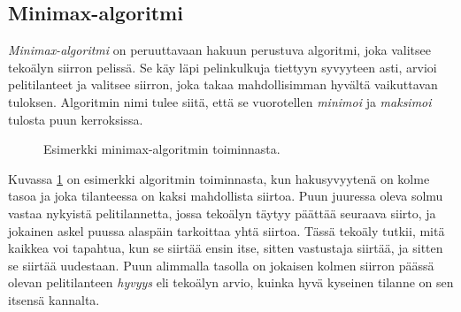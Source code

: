 \subsection{Minimax-algoritmi}

\emph{Minimax-algoritmi} on peruuttavaan hakuun perustuva algoritmi,
joka valitsee tekoälyn siirron pelissä.
Se käy läpi pelinkulkuja tiettyyn syvyyteen asti,
arvioi pelitilanteet ja valitsee siirron,
joka takaa mahdollisimman hyvältä vaikuttavan tuloksen.
Algoritmin nimi tulee siitä, että se vuorotellen
\emph{minimoi} ja \emph{maksimoi} tulosta puun kerroksissa.

\begin{figure}
\center
{}
\caption{Esimerkki minimax-algoritmin toiminnasta.}
\label{fig:minmax}
\end{figure}

Kuvassa \ref{fig:minmax} on esimerkki algoritmin toiminnasta,
kun hakusyvyytenä on kolme tasoa ja
joka tilanteessa on kaksi mahdollista siirtoa.
Puun juuressa oleva solmu vastaa nykyistä pelitilannetta,
jossa tekoälyn täytyy päättää seuraava siirto,
ja jokainen askel puussa alaspäin tarkoittaa yhtä siirtoa.
Tässä tekoäly tutkii, mitä kaikkea voi tapahtua,
kun se siirtää ensin itse, sitten vastustaja siirtää,
ja sitten se siirtää uudestaan.
Puun alimmalla tasolla on jokaisen
kolmen siirron päässä olevan pelitilanteen \emph{hyvyys}
eli tekoälyn arvio,
kuinka hyvä kyseinen tilanne on sen itsensä kannalta.

